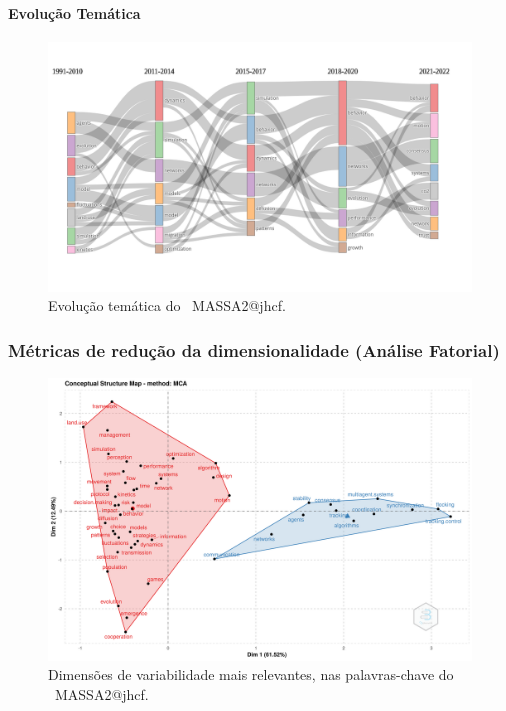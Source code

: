 \paragraph{Evolução Temática}

\begin{figure}
    \centering
    \includegraphics[width=1\textwidth]{experiments/jhcf/PesqBibliogr/SimulacaoMultiagente/WoS-20220203/Estrutura/Conceitual/MASSA2-Thematic-Evolution.png}
    \caption{Evolução temática do  \dataset\ MASSA2@jhcf.}
    \label{fig:MASSA2-ThematicMap}
\end{figure}

\subsubsection{Métricas de redução da dimensionalidade (Análise Fatorial)}

\begin{figure}
    \centering
    \includegraphics[width=1\textwidth]{experiments/jhcf/PesqBibliogr/SimulacaoMultiagente/WoS-20220203/Estrutura/Conceitual/MASSA2-FactorialAnalysis-MCA-FactorialMap.png}
    \caption{Dimensões de variabilidade mais relevantes, nas palavras-chave do  \dataset\ MASSA2@jhcf.}
    \label{fig:MASSA2-FactorialAnalysis-MCA-FactorialMap}
\end{figure}

